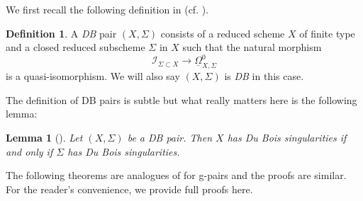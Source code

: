 \documentclass[11pt]{amsart}
\numberwithin{equation}{section}
\newtheorem{lem}[thm]{Lemma}
\theoremstyle{definition}
\newtheorem{defn}[thm]{Definition}
\theoremstyle{definition}
\theoremstyle{definition}
\begin{document}
We first recall the following definition in \cite{Kov11} (cf. \cite[Definition 6.10]{Kol13}). 

\begin{defn}
A \emph{DB} pair $(X,\Sigma)$ consists of a reduced scheme $X$ of finite type and a closed reduced subscheme $\Sigma$ in $X$ such that the natural morphism
$$
\mathcal{I}_{\Sigma\subset X}\to \underline{\Omega}_{X,\Sigma}^0
$$
is a quasi-isomorphism. We will also say $(X,\Sigma)$ is \emph{DB} in this case.
\end{defn}

The definition of DB pairs is subtle but what really matters here is the following lemma:

\begin{lem}[{\cite[Proposition 6.15]{Kol13}}]\label{lem: property of DB pairs}
Let $(X,\Sigma)$ be a DB pair. Then $X$ has Du Bois singularities if and only if $\Sigma$ has Du Bois singularities.
\end{lem}

The following theorems are analogues of \cite[Theorems 6.31, 6.33]{Kol13} for g-pairs and the proofs are similar. For the reader's convenience, we provide full proofs here.
\end{document}

